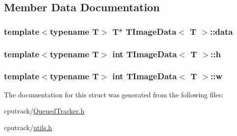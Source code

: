 \subsection{Member Data Documentation}
\subsubsection[{\texorpdfstring{data}{data}}]{\setlength{\rightskip}{0pt plus 5cm}template$<$typename T$>$ T$\ast$ {\bf T\+Image\+Data}$<$ T $>$\+::data}\hypertarget{struct_t_image_data_a78c7415ecee3965da7e25149cea6f4d8}{}\label{struct_t_image_data_a78c7415ecee3965da7e25149cea6f4d8}
\subsubsection[{\texorpdfstring{h}{h}}]{\setlength{\rightskip}{0pt plus 5cm}template$<$typename T$>$ int {\bf T\+Image\+Data}$<$ T $>$\+::h}\hypertarget{struct_t_image_data_a252235d07e487e8d02908aed062147bd}{}\label{struct_t_image_data_a252235d07e487e8d02908aed062147bd}
\subsubsection[{\texorpdfstring{w}{w}}]{\setlength{\rightskip}{0pt plus 5cm}template$<$typename T$>$ int {\bf T\+Image\+Data}$<$ T $>$\+::w}\hypertarget{struct_t_image_data_aa46faa6f66f9d6f93c65e14aea643eb3}{}\label{struct_t_image_data_aa46faa6f66f9d6f93c65e14aea643eb3}


The documentation for this struct was generated from the following files\+:\begin{DoxyCompactItemize}
\item 
cputrack/\hyperlink{_queued_tracker_8h}{Queued\+Tracker.\+h}\item 
cputrack/\hyperlink{utils_8h}{utils.\+h}\end{DoxyCompactItemize}

